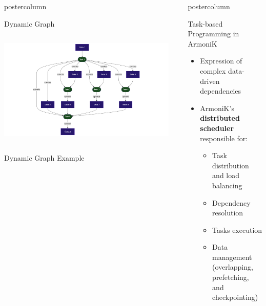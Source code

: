 \begin{frame}[fragile]
\begin{columns}
\begin{column}{.49\textwidth}
\begin{beamercolorbox}[center,wd=\textwidth]{postercolumn}
\begin{minipage}[T]{.95\textwidth}
{\begin{block}{Dynamic Graph}
\begin{columns}[T]
\begin{column}{0.65\textwidth}
                \includegraphics[width=0.95\textwidth]{mermaid-dynamic-part2.png}
            \end{column}
            \end{columns}
            \end{block}

            \begin{block}{Dynamic Graph Example}
            
            \end{block}

          }
        \end{minipage}
      \end{beamercolorbox}
    \end{column}
    \begin{column}{.49\textwidth}
      \begin{beamercolorbox}[center,wd=\textwidth]{postercolumn}
        \begin{minipage}[T]{.95\textwidth}
          \parbox[t][\columnheight]{\textwidth}{
            
            \begin{block}{Task-based Programming in ArmoniK}
            
                \begin{itemize}
                \item Expression of complex data-driven dependencies
                \item ArmoniK's \textbf{distributed scheduler} responsible for:
                \begin{itemize}
                    \item Task distribution and load balancing
                    \item Dependency resolution
                    \item Tasks execution
                    \item Data management (overlapping, prefetching, and checkpointing)
                \end{itemize}
                \end{itemize}
            \end{block}
            


}
\end{minipage}
\end{beamercolorbox}
\end{column}
\end{columns}
\end{frame}
